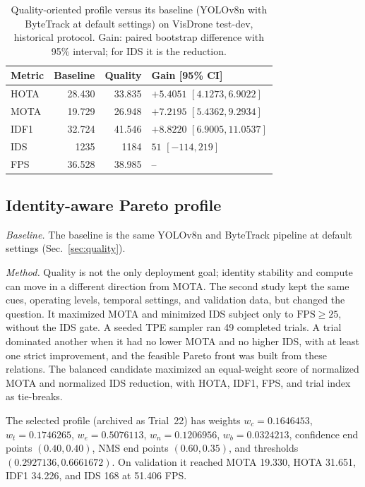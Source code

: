 \documentclass[journal]{new-aiaa}
\begin{document}
\begin{table}[htbp]
\caption{Quality-oriented profile versus its baseline (YOLOv8n with ByteTrack
at default settings) on VisDrone test-dev, historical protocol. Gain: paired
bootstrap difference with 95\% interval; for IDS it is the reduction.}
\label{tab:quality}
\centering\footnotesize
\setlength{\tabcolsep}{4pt}
\begin{tabular}{@{}lrrl@{}}
\toprule
Metric & Baseline & Quality & Gain [95\% CI]\\
\midrule
HOTA & 28.430 & 33.835 & $+5.4051$ $[4.1273, 6.9022]$\\
MOTA & 19.729 & 26.948 & $+7.2195$ $[5.4362, 9.2934]$\\
IDF1 & 32.724 & 41.546 & $+8.8220$ $[6.9005, 11.0537]$\\
IDS & 1235 & 1184 & $51$ $[-114, 219]$\\
FPS & 36.528 & 38.985 & --\\
\bottomrule
\end{tabular}
\end{table}

\subsection{Identity-aware Pareto profile}\label{sec:identity}

\emph{Baseline.} The baseline is the same YOLOv8n and ByteTrack pipeline at
default settings (Sec.~\ref{sec:quality}).

\emph{Method.} Quality is not the only deployment goal; identity stability and
compute can move in a different direction from MOTA. The second study kept
the same cues, operating levels, temporal settings, and validation data, but
changed the question. It maximized MOTA and minimized IDS subject only to
$\mathrm{FPS}\geq25$, without the IDS gate. A seeded TPE sampler ran 49
completed trials. A trial dominated another when it had no lower MOTA and no
higher IDS, with at least one strict improvement, and the feasible Pareto
front was built from these relations. The balanced
candidate maximized an equal-weight score of normalized MOTA and normalized IDS
reduction, with HOTA, IDF1, FPS, and trial index as tie-breaks.

The selected profile (archived as Trial~22) has weights $w_c=0.1646453$,
$w_t=0.1746265$, $w_e=0.5076113$, $w_n=0.1206956$, $w_b=0.0324213$,
confidence end points $(0.40,0.40)$, NMS end points $(0.60,0.35)$, and
thresholds $(0.2927136, 0.6661672)$. On validation it reached MOTA 19.330,
HOTA 31.651, IDF1 34.226, and IDS 168 at 51.406 FPS.
\end{document}
